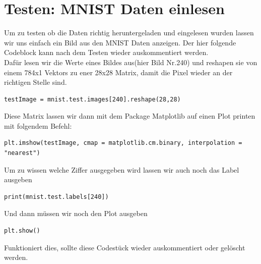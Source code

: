 \section{Testen: MNIST Daten einlesen}
Um zu testen ob die Daten richtig heruntergeladen und eingelesen wurden lassen wir uns einfach ein Bild aus den MNIST Daten anzeigen. Der hier folgende Codeblock kann nach dem Testen wieder auskommentiert werden.\\
Dafür lesen wir die Werte eines Bildes aus(hier Bild Nr.240) und reshapen sie von einem 784x1 Vektors zu ener 28x28 Matrix, damit die Pixel wieder an der richtigen Stelle sind.
\lstset{language=Python}
\begin{lstlisting}
testImage = mnist.test.images[240].reshape(28,28)
\end{lstlisting}
Diese Matrix lassen wir dann mit dem Package Matplotlib auf einen Plot printen mit folgendem Befehl:
\begin{lstlisting}
plt.imshow(testImage, cmap = matplotlib.cm.binary, interpolation = "nearest")
\end{lstlisting}
Um zu wissen welche Ziffer ausgegeben wird lassen wir auch noch das Label ausgeben
\begin{lstlisting}
print(mnist.test.labels[240])
\end{lstlisting}
Und dann müssen wir noch den Plot ausgeben
\begin{lstlisting}
plt.show()
\end{lstlisting}
Funktioniert dies, sollte diese Codestück wieder auskommentiert oder gelöscht werden.

\label{cha:MNIST}